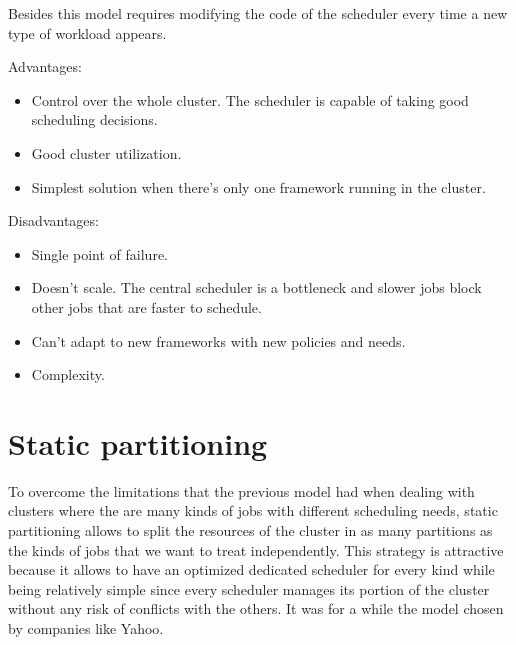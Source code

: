 \documentclass{report}                     %
\begin{document}
Besides this model requires modifying the code of the scheduler every
time a new type of workload appears. 

Advantages:

\begin{itemize}
  \item Control over the whole cluster. The scheduler is capable of taking good scheduling decisions.
  \item Good cluster utilization.
  \item Simplest solution when there's only one framework running in the cluster.
\end{itemize}

Disadvantages:

\begin{itemize}
  \item Single point of failure.
  \item Doesn't scale. The central scheduler is a bottleneck and
    slower jobs block other jobs that are faster to schedule.
  \item Can't adapt to new frameworks with new policies and needs.
  \item Complexity.
\end{itemize}

\section{Static partitioning}

To overcome the limitations that the previous model had when dealing
with clusters where the are many kinds of jobs with different scheduling
needs, static partitioning allows to split the resources of the cluster
in as many partitions as the kinds of jobs that we want to
treat independently. This strategy is attractive because it allows to
have an optimized dedicated scheduler for every kind while being
relatively simple since every scheduler manages its portion of the
cluster without any risk of conflicts with the others. It was
for a while the model chosen by companies like Yahoo.
\end{document}
